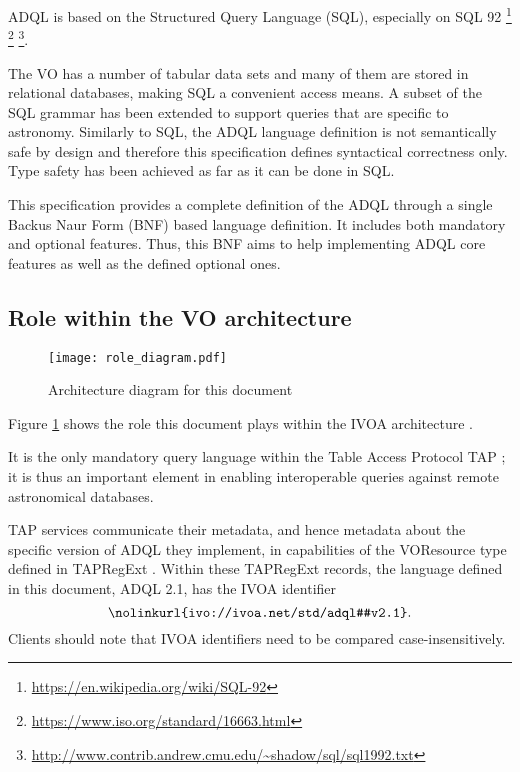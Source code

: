 \documentclass[11pt,a4paper]{ivoa}
\begin{document}
ADQL is based on the Structured Query Language (SQL), especially on SQL 92
\footnote{\url{https://en.wikipedia.org/wiki/SQL-92}}
\footnote{\url{https://www.iso.org/standard/16663.html}}
\footnote{\url{http://www.contrib.andrew.cmu.edu/~shadow/sql/sql1992.txt}}.

The VO has a number of tabular data sets and many of them are stored in relational
databases, making SQL a convenient access means. A subset of the SQL grammar
has been extended to support queries that are specific to astronomy. Similarly
to SQL, the ADQL language definition is not semantically safe by design and
therefore this specification defines syntactical correctness only. Type safety
has been achieved as far as it can be done in SQL.

This specification provides a complete definition of the ADQL through a single
Backus Naur Form (BNF) based language definition. It includes both mandatory
and optional features. Thus, this BNF aims to help implementing ADQL core
features as well as the defined optional ones.

\clearpage %
\subsection{Role within the VO architecture}
\label{sec:role}

\begin{figure}[th]
\centering
\texttt{[image: role\_diagram.pdf]}
\caption{Architecture diagram for this document}
\label{fig:archdiag}
\end{figure}

Figure \ref{fig:archdiag} shows the role this document plays within the
IVOA architecture \VOArch{}.

It is the only mandatory query language within the Table Access Protocol
TAP \citep{2019ivoa.spec.0927D}; it is thus an important element in
enabling interoperable queries against remote astronomical databases.

TAP services communicate their metadata, and hence metadata about the
specific version of ADQL they implement, in capabilities of the
VOResource type  defined in TAPRegExt
\citep{2012ivoa.spec.0827D}.  Within these TAPRegExt records, the
language defined in this document, ADQL 2.1, has the IVOA identifier $$
\hbox{\nolinkurl{ivo://ivoa.net/std/adql#v2.1}}.$$ Clients should note
that IVOA identifiers need to be compared case-insensitively.
\end{document}
